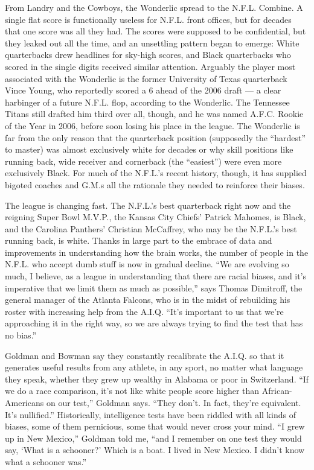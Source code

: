 From Landry and the Cowboys, the Wonderlic spread to the N.F.L. Combine.
A single flat score is functionally useless for N.F.L. front offices,
but for decades that one score was all they had. The scores were
supposed to be confidential, but they leaked out all the time, and an
unsettling pattern began to emerge: White quarterbacks drew headlines
for sky-high scores, and Black quarterbacks who scored in the single
digits received similar attention. Arguably the player most associated
with the Wonderlic is the former University of Texas quarterback Vince
Young, who reportedly scored a 6 ahead of the 2006 draft --- a clear
harbinger of a future N.F.L. flop, according to the Wonderlic. The
Tennessee Titans still drafted him third over all, though, and he was
named A.F.C. Rookie of the Year in 2006, before soon losing his place in
the league. The Wonderlic is far from the only reason that the
quarterback position (supposedly the ``hardest'' to master) was almost
exclusively white for decades or why skill positions like running back,
wide receiver and cornerback (the ``easiest'') were even more
exclusively Black. For much of the N.F.L.'s recent history, though, it
has supplied bigoted coaches and G.M.s all the rationale they needed to
reinforce their biases.

The league is changing fast. The N.F.L.'s best quarterback right now and
the reigning Super Bowl M.V.P., the Kansas City Chiefs' Patrick Mahomes,
is Black, and the Carolina Panthers' Christian McCaffrey, who may be the
N.F.L.'s best running back, is white. Thanks in large part to the
embrace of data and improvements in understanding how the brain works,
the number of people in the N.F.L. who accept dumb stuff is now in
gradual decline. ``We are evolving so much, I believe, as a league in
understanding that there are racial biases, and it's imperative that we
limit them as much as possible,'' says Thomas Dimitroff, the general
manager of the Atlanta Falcons, who is in the midst of rebuilding his
roster with increasing help from the A.I.Q. ``It's important to us that
we're approaching it in the right way, so we are always trying to find
the test that has no bias.''

Goldman and Bowman say they constantly recalibrate the A.I.Q. so that it
generates useful results from any athlete, in any sport, no matter what
language they speak, whether they grew up wealthy in Alabama or poor in
Switzerland. ``If we do a race comparison, it's not like white people
score higher than African-Americans on our test,'' Goldman says. ``They
don't. In fact, they're equivalent. It's nullified.'' Historically,
intelligence tests have been riddled with all kinds of biases, some of
them pernicious, some that would never cross your mind. ``I grew up in
New Mexico,'' Goldman told me, ``and I remember on one test they would
say, `What is a schooner?' Which is a boat. I lived in New Mexico. I
didn't know what a schooner was.''

